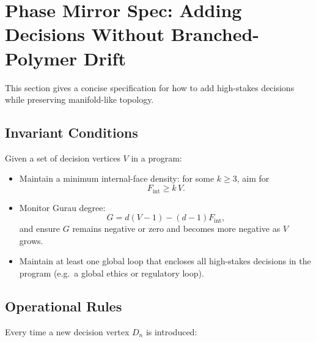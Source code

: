 \documentclass[11pt]{article}
\begin{document}
\section{Phase Mirror Spec: Adding Decisions Without Branched-Polymer Drift}

This section gives a concise specification for how to add high-stakes decisions while preserving manifold-like topology.

\subsection{Invariant Conditions}

Given a set of decision vertices \(V\) in a program:
\begin{itemize}
  \item Maintain a minimum internal-face density: for some \(k \ge 3\), aim for
  \[
  F_{\text{int}} \ge k\,V.
  \]
  \item Monitor Gurau degree:
  \[
  G = d(V - 1) - (d - 1)F_{\text{int}},
  \]
  and ensure \(G\) remains negative or zero and becomes more negative as \(V\) grows.
  \item Maintain at least one global loop that encloses all high-stakes decisions in the program (e.g.\ a global ethics or regulatory loop).
\end{itemize}

\subsection{Operational Rules}

Every time a new decision vertex \(D_n\) is introduced:
\end{document}
